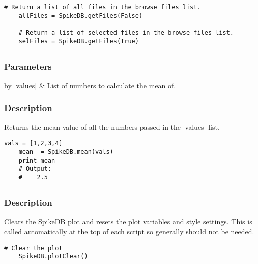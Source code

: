 \documentclass{report}
\begin{document}
\begin{lstlisting}[caption=Example]
	# Return a list of all files in the browse files list.
	allFiles = SpikeDB.getFiles(False)

	# Return a list of selected files in the browse files list.
	selFiles = SpikeDB.getFiles(True)
\end{lstlisting}


\clearpage
\subsection{}
\subsubsection{Parameters}
\begin{table}[h]
\begin{center}
\begin{tabular}{by}
		|values| & List of numbers to calculate the mean of.\\
	\end{tabular}
\end{center}
\end{table}
\subsubsection{Description}
Returns the mean value of all the numbers passed in the |values| list.
\begin{lstlisting}[caption=Example]
	vals = [1,2,3,4]
	mean  = SpikeDB.mean(vals)
	print mean
	# Output:
	#    2.5
\end{lstlisting}

\clearpage
\subsection{}
\subsubsection{Description}
Clears the SpikeDB plot and resets the plot variables and style settings. This is called automatically at the top of each script so generally should not be needed.
\begin{lstlisting}[caption=Example]
	# Clear the plot
	SpikeDB.plotClear()
\end{lstlisting}


\clearpage
\subsection{}
\end{document}
